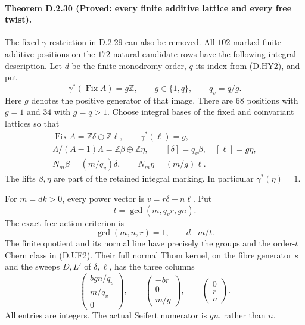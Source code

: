 \paragraph{Theorem D.2.30 (Proved: every finite additive lattice and every free twist).}
The fixed-$\gamma$ restriction in D.2.29 can also be removed.
All $102$ marked finite additive positions on the $172$ natural
candidate rows have the following integral description.
Let $d$ be the finite monodromy order, $q$ its index from
(D.HY2), and put
\[
 \gamma^*(\operatorname{Fix}A)=g\mathbb Z,\qquad
 g\in\{1,q\},\qquad q_v=q/g.
                                                               \tag{D.AF1}
\]
Here $g$ denotes the positive generator of that image.
There are $68$ positions with $g=1$ and $34$ with $g=q>1$.
Choose integral bases of the fixed and coinvariant lattices
so that
\[
\begin{gathered}
 \operatorname{Fix}A=\mathbb Z\delta\oplus\mathbb Z\ell,
 \qquad \gamma^*(\ell)=g,\\
 \Lambda/(A-1)\Lambda=\mathbb Z\beta\oplus\mathbb Z\eta,
 \qquad [\delta]=q_v\beta,\quad [\ell]=g\eta,\\
 N_m\beta=(m/q_v)\delta,
 \qquad N_m\eta=(m/g)\ell.
\end{gathered}                                                \tag{D.AF2}
\]
The lifts $\beta,\eta$ are part of the retained integral
marking. In particular $\gamma^*(\eta)=1$.

For $m=dk>0$, every power vector is $v=r\delta+n\ell$.
Put
\[
 t=\gcd(m,q_vr,gn).
\]
The exact free-action criterion is
\[
 \gcd(m,n,r)=1,\qquad d\mid m/t.                            \tag{D.AF3}
\]
The finite quotient and its normal line have precisely the
groups and the order-$t$ Chern class in (D.UF2).
Their full normal Thom kernel, on the fibre generator $s$
and the sweeps $D,L'$ of $\delta,\ell$, has the three columns
\[
 \begin{pmatrix}bgn/q_v\\m/q_v\\0\end{pmatrix},\qquad
 \begin{pmatrix}-br\\0\\m/g\end{pmatrix},\qquad
 \begin{pmatrix}0\\r\\n\end{pmatrix}.                     \tag{D.AF4}
\]
All entries are integers. The actual Seifert numerator is
$gn$, rather than $n$.

